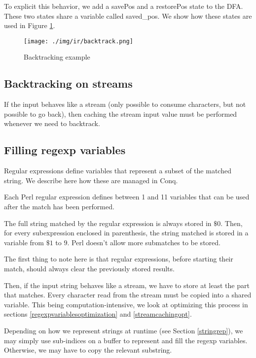 \documentclass[11pt,a4paper]{report}
\newcommand{\regexp}[1]{$#1$}
\newcommand{\haskell}[1]{\textsf{#1}}
\begin{document}
To explicit this behavior, we add a \haskell{savePos} and a \haskell{restorePos} state to the DFA. These two states share a variable called \haskell{saved\_pos}. We show how these states are used in Figure \ref{backtrackexample}.

\begin{figure}[t]
	\centering
	\texttt{[image: ./img/ir/backtrack.png]}
	\caption{Backtracking example}
	\label{backtrackexample}
\end{figure}

\subsection{Backtracking on streams}

If the input behaves like a stream (only possible to consume characters, but not possible to go back), then caching the stream input value must be performed whenever we need to backtrack.

\subsection{Filling regexp variables}
\label{regexpvariables}

Regular expressions define variables that represent a subset of the matched string. We describe here how these are managed in Conq.

Each Perl regular expression defines between 1 and 11 variables that can be used after the match has been performed.

The full string matched by the regular expression is always stored in \regexp{\$0}. Then, for every subexpression enclosed in parenthesis, the string matched is stored in a variable from \regexp{\$1} to \regexp{9}. Perl doesn't allow more submatches to be stored.

The first thing to note here is that regular expressions, before starting their match, should always clear the previously stored results.

Then, if the input string behaves like a stream, we have to store at least the part that matches. Every character read from the stream must be copied into a shared variable. This being computation-intensive, we look at optimizing this process in sections \ref{regexpvariablesoptimization} and \ref{streamcachingopt}.

Depending on how we represent strings at runtime (see Section \ref{stringrep}), we may simply use sub-indices on a buffer to represent and fill the regexp variables. Otherwise, we may have to copy the relevant substring.
\end{document}
